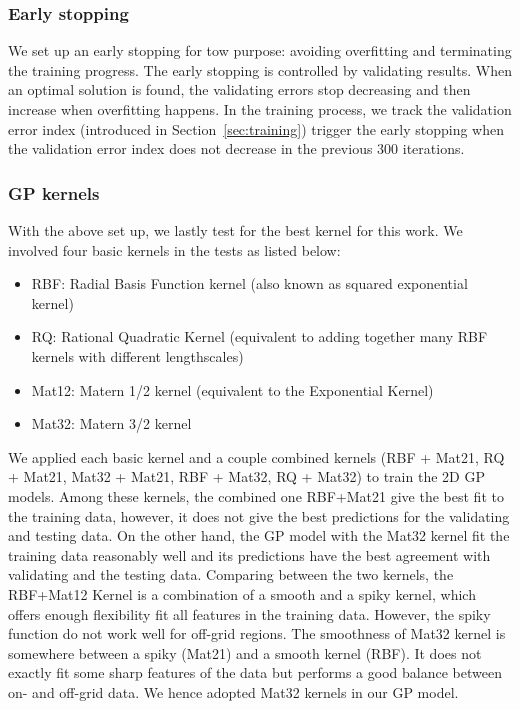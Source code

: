 \subsubsection{Early stopping}

We set up an early stopping for tow purpose: avoiding overfitting and terminating the training progress. 
The early stopping is controlled by validating results. When an optimal solution is found, the validating errors stop decreasing and then increase when overfitting happens. In the training process, we track the validation error index (introduced in Section~\ref{sec:training}) trigger the early stopping when the validation error index does not decrease in the previous 300 iterations. 

\subsubsection{GP kernels}

With the above set up, we lastly test for the best kernel for this work. We involved four basic kernels in the tests as listed below:
\begin{itemize}
\item RBF: Radial Basis Function kernel (also known as squared exponential kernel)
\item RQ: Rational Quadratic Kernel (equivalent to adding together many RBF kernels with different lengthscales)
\item Mat12: Matern 1/2 kernel (equivalent to the Exponential Kernel)
\item Mat32: Matern 3/2 kernel 
\end{itemize}
We applied each basic kernel and a couple combined kernels (RBF + Mat21, RQ + Mat21, Mat32 + Mat21, RBF + Mat32, RQ + Mat32) to train the 2D GP models. Among these kernels, the combined one RBF+Mat21 give the best fit to the training data, however, it does not give the best predictions for the validating and testing data. On the other hand, the GP model with the Mat32 kernel fit the training data reasonably well and its predictions have the best agreement with validating and the testing data. 
%
Comparing between the two kernels, the RBF+Mat12 Kernel is a combination of a smooth and a spiky kernel, which offers enough flexibility fit all features in the training data. However, the spiky function do not work well for off-grid regions. 
%
The smoothness of Mat32 kernel is somewhere between a spiky (Mat21) and a smooth kernel (RBF). It does not exactly fit some sharp features of the data but performs a good balance between on- and off-grid data. We hence adopted Mat32 kernels in our GP model.  

